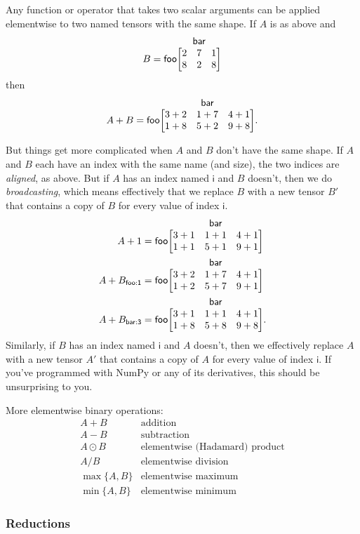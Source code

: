 \documentclass{article}
\makeatletter
\newcommand{\name}[1]{\mathsf{#1}}
\newcommand{\nmatrix}[3]{\name{#1}\begin{array}[b]{@{}c@{}}\name{#2}\\\begin{bmatrix}#3\end{bmatrix}\end{array}}
\makeatother
\begin{document}
Any function or operator that takes two scalar arguments can be applied elementwise to two named tensors with the same shape. If $A$ is as above and
\begin{equation*}
B = \nmatrix{foo}{bar}{
  2 & 7 & 1 \\
  8 & 2 & 8
}
\end{equation*}
then
\begin{equation*}
A + B = \nmatrix{foo}{bar}{
  3+2 & 1+7 & 4+1 \\
  1+8 & 5+2 & 9+8
}.
\end{equation*}

But things get more complicated when $A$ and $B$ don't have the same shape. If $A$ and $B$ each have an index with the same name (and size), the two indices are \emph{aligned}, as above. But if $A$ has an index named $\name{i}$ and $B$ doesn't, then we do \emph{broadcasting}, which means effectively that we replace $B$ with a new tensor $B'$ that contains a copy of $B$ for every value of index $\name{i}$.
\begin{align*}
A + 1 &= \nmatrix{foo}{bar}{
  3+1 & 1+1 & 4+1 \\
  1+1 & 5+1 & 9+1
} \\
A + B_{\name{foo:1}} &= \nmatrix{foo}{bar}{
  3+2 & 1+7 & 4+1 \\
  1+2 & 5+7 & 9+1
} \\
A + B_{\name{bar:3}} &= \nmatrix{foo}{bar}{
  3+1 & 1+1 & 4+1 \\
  1+8 & 5+8 & 9+8
}.
\end{align*}
Similarly, if $B$ has an index named $\name{i}$ and $A$ doesn't, then we effectively replace $A$ with a new tensor $A'$ that contains a copy of $A$ for every value of index $\name{i}$. If you've programmed with NumPy or any of its derivatives, this should be unsurprising to you.

More elementwise binary operations:
\[\begin{array}{cl}
A+B & \text{addition} \\
A-B & \text{subtraction} \\
A\odot B & \text{elementwise (Hadamard) product} \\
A / B & \text{elementwise division} \\
\max \{A, B\} & \text{elementwise maximum} \\
\min \{A, B\} & \text{elementwise minimum}
\end{array}\]

\subsubsection{Reductions}
\end{document}
